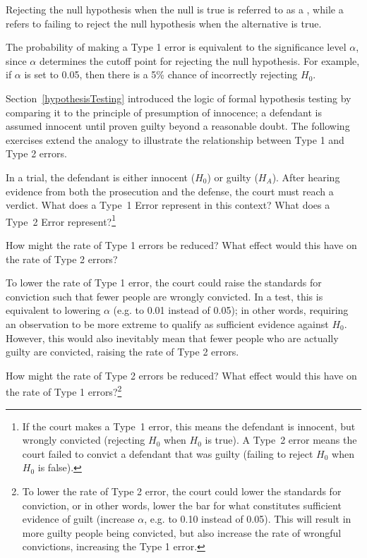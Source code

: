 \begin{spacing}{1.5}
Rejecting the null hypothesis when the null is true is referred to as a , while a  refers to failing to reject the null hypothesis when the alternative is true. 

The probability of making a Type 1 error is equivalent to the significance level $\alpha$, since $\alpha$ determines the cutoff point for rejecting the null hypothesis. For example, if $\alpha$ is set to 0.05, then there is a 5\% chance of incorrectly rejecting $H_0$. 

Section~\ref{hypothesisTesting} introduced the logic of formal hypothesis testing by comparing it to the principle of presumption of innocence; a defendant is assumed innocent until proven guilty beyond a reasonable doubt. The following exercises extend the analogy to illustrate the relationship between Type 1 and Type 2 errors.

\begin{exercise} \label{whatAreTheErrorTypesInUSCourts}
	In a trial, the defendant is either innocent ($H_0$) or guilty ($H_A$). After hearing evidence from both the prosecution and the defense, the court must reach a verdict. What does a Type~1 Error represent in this context? What does a Type~2 Error represent?\footnote{If the court makes a Type~1 error, this means the defendant is innocent, but wrongly convicted (rejecting $H_0$ when $H_0$ is true). A Type~2 error means the court failed to convict a defendant that was guilty (failing to reject $H_0$ when $H_0$ is false).}
\end{exercise}

\begin{example}{How might the rate of Type 1 errors be reduced? What effect would this have on the rate of Type 2 errors?}
	
	To lower the rate of Type 1 error, the court could raise the standards for conviction such that fewer people are wrongly convicted. In a test, this is equivalent to lowering $\alpha$ (e.g. to 0.01 instead of 0.05); in other words, requiring an observation to be more extreme to qualify as sufficient evidence against $H_0$. However, this would also inevitably mean that fewer people who are actually guilty are convicted, raising the rate of Type 2 errors.
\end{example}

\begin{exercise} \label{howToReduceType2ErrorsInUSCourts}
	How might the rate of Type 2 errors be reduced? What effect would this have on the rate of Type 1 errors?\footnote{To lower the rate of Type 2 error, the court could lower the standards for conviction, or in other words, lower the bar for what constitutes sufficient evidence of guilt (increase $\alpha$, e.g. to 0.10 instead of 0.05). This will result in more guilty people being convicted, but also increase the rate of wrongful convictions, increasing the Type 1 error.}
\end{exercise}


\end{spacing}
